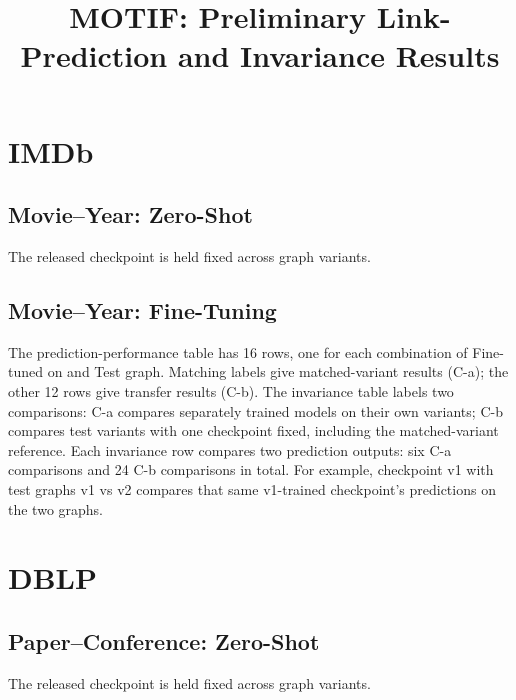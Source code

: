 \documentclass[11pt,a4paper]{article}
\title{MOTIF: Preliminary Link-Prediction and Invariance Results}
\author{}
\date{}
\begin{document}
\maketitle

\section{IMDb}
\subsection{Movie--Year: Zero-Shot}
The released checkpoint is held fixed across graph variants.

\FloatBarrier

\FloatBarrier

\clearpage
\subsection{Movie--Year: Fine-Tuning}


The prediction-performance table has 16 rows, one for each combination of
Fine-tuned on and Test graph. Matching labels give matched-variant results
(C-a); the other 12 rows give transfer results (C-b).
The invariance table labels two comparisons: C-a compares separately trained
models on their own variants; C-b compares test variants with one checkpoint
fixed, including the matched-variant reference. Each invariance row compares
two prediction outputs: six C-a comparisons and 24 C-b comparisons in total.
For example, checkpoint v1 with test graphs v1 vs v2 compares that same
v1-trained checkpoint's predictions on the two graphs.

\FloatBarrier

\FloatBarrier

\clearpage
\section{DBLP}
\subsection{Paper--Conference: Zero-Shot}
The released checkpoint is held fixed across graph variants.

\FloatBarrier

\FloatBarrier

\FloatBarrier
\end{document}
